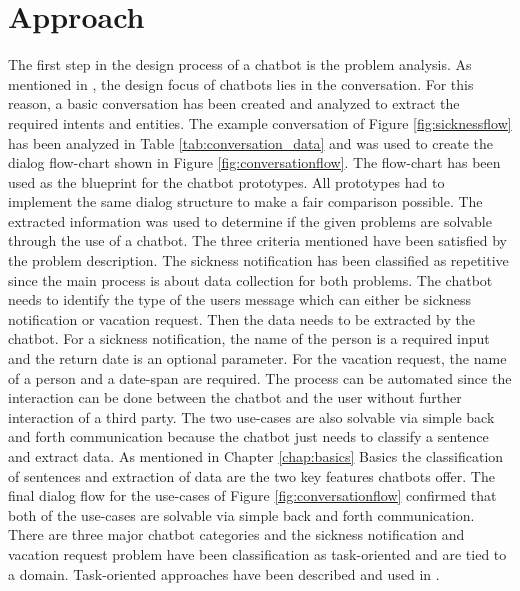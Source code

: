 \section{Approach} %
The first step in the design process of a chatbot is the problem analysis.
As mentioned in \citet{folstad2017chatbots}, the design focus of chatbots lies in the conversation.
For this reason, a basic conversation has been created and analyzed 
to extract the required intents and entities.
The example conversation of Figure \ref{fig:sicknessflow} has been 
analyzed in Table \ref{tab:conversation_data} and was used to create the dialog 
flow-chart shown in Figure \ref{fig:conversationflow}. 
The flow-chart has been used as the blueprint for the chatbot prototypes.
All prototypes had to implement the same dialog structure to make 
a fair comparison possible.
The extracted information was used to determine if the given problems are 
solvable through the use of a chatbot.
The three criteria \citet{singhbuilding} mentioned have been satisfied by 
the problem description.
The sickness notification has been classified as repetitive since the main 
process is about data collection for both problems.
The chatbot needs to identify the type of the users message which can either be 
sickness notification or vacation request.
Then the data needs to be extracted by the chatbot.
For a sickness notification, the name of the person is a required input and 
the return date is an optional parameter.
For the vacation request, the name of a person and a date-span are required. 
The process can be automated since the interaction can be done between 
the chatbot and the user without further interaction of a third party.
The two use-cases are also solvable via simple back and forth communication 
because the chatbot just needs to classify a sentence and 
extract data. 
As mentioned in Chapter \ref{chap:basics} Basics the classification of sentences and extraction 
of data are the two key features chatbots offer.
The final dialog flow for the use-cases of Figure \ref{fig:conversationflow}
confirmed that both of the use-cases are solvable via simple back and forth 
communication.
There are three major chatbot categories and the sickness notification and 
vacation request problem have been classification as task-oriented and are 
tied to a domain.
Task-oriented approaches have been described and used in 
\citet{deshpande2017survey, luis2015williams, braunEvaluatingNLU, williams2017hybrid}.
